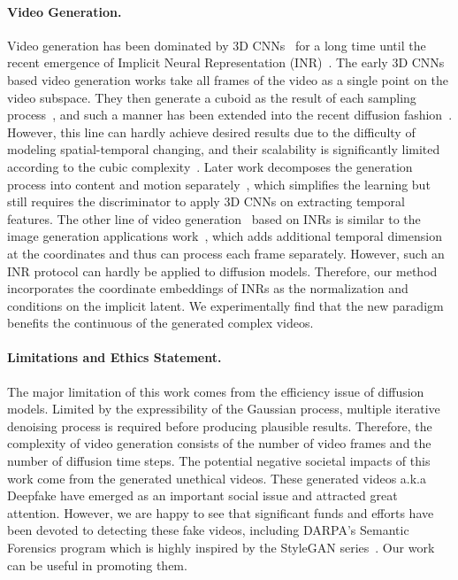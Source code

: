 \documentclass[letterpaper]{article}
\begin{document}
\paragraph{Video Generation.}
Video generation has been dominated by 3D CNNs~\cite{tran2015learning} for a long time until the recent emergence of Implicit Neural Representation (INR)~\cite{sitzmann2020implicit, tancik2020fourier}.
The early 3D CNNs based video generation works take all frames of the video as a single point on the video subspace.
They then generate a cuboid as the result of each sampling process~\cite{vondrick2016generating, saito2017temporal}, and such a manner has been extended into the recent diffusion fashion~\cite{ho2022video, harvey2022flexible}.
However, this line can hardly achieve desired results due to the difficulty of modeling spatial-temporal changing, and their scalability is significantly limited according to the cubic complexity~\cite{saito2020train}.
Later work decomposes the generation process into content and motion separately~\cite{tulyakov2018mocogan, clark2019adversarial, tian2021a, fox2021stylevideogan}, which simplifies the learning but still requires the discriminator to apply 3D CNNs on extracting temporal features.
The other line of video generation~\cite{yu2022generating,skorokhodov2021stylegan} based on INRs is similar to the image generation applications work~\cite{skorokhodov2021adversarial}, which adds additional temporal dimension at the coordinates and thus can process each frame separately.
However, such an INR protocol can hardly be applied to diffusion models.
Therefore, our method incorporates the coordinate embeddings of INRs as the normalization and conditions on the implicit latent.
We experimentally find that the new paradigm benefits the continuous of the generated complex videos.

\paragraph{Limitations and Ethics Statement.}
The major limitation of this work comes from the efficiency issue of diffusion models.
Limited by the expressibility of the Gaussian process, multiple iterative denoising process is required before producing plausible results. 
Therefore, the complexity of video generation consists of the number of video frames and the number of diffusion time steps.
The potential negative societal impacts of this work come from the generated unethical videos.
These generated videos a.k.a Deepfake have emerged as an important social issue and attracted great attention.
However, we are happy to see that significant funds and efforts have been devoted to detecting these fake videos, including DARPA's Semantic Forensics program which is highly inspired by the StyleGAN series~\cite{karras2019style}.
Our work can be useful in promoting them.
\end{document}
